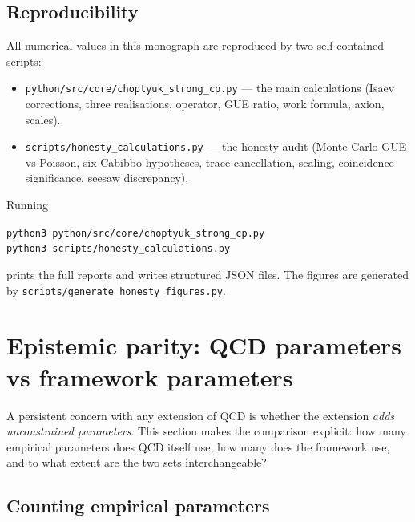 \documentclass[11pt,a4paper]{article}
\theoremstyle{plain}
\theoremstyle{definition}
\theoremstyle{remark}
\begin{document}
\subsection{Reproducibility}

{\sloppy
All numerical values in this monograph are reproduced by two
self-contained scripts:
\begin{itemize}[leftmargin=1.4em,itemsep=1pt]
  \item \texttt{python/src/core/choptyuk\_strong\_cp.py} --- the main
        calculations (Isaev corrections, three realisations, operator,
        GUE ratio, work formula, axion, scales).
  \item \texttt{scripts/honesty\_calculations.py} --- the honesty
        audit (Monte Carlo GUE vs Poisson, six Cabibbo hypotheses,
        trace cancellation, scaling, coincidence significance, seesaw
        discrepancy).
\end{itemize}
Running
\begin{center}
\texttt{python3 python/src/core/choptyuk\_strong\_cp.py}\\
\texttt{python3 scripts/honesty\_calculations.py}
\end{center}
prints the full reports and writes structured JSON files.  The figures
are generated by \texttt{scripts/generate\_honesty\_figures.py}.
\par}

\section{Epistemic parity: QCD parameters vs framework parameters}
\label{sec:epistemic-parity}

A persistent concern with any extension of QCD is whether the
extension \emph{adds unconstrained parameters}.  This section
makes the comparison explicit: how many empirical parameters does
QCD itself use, how many does the framework use, and to what
extent are the two sets interchangeable?

\subsection{Counting empirical parameters}
\end{document}
